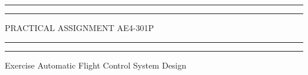  
    \begin{titlepage} %

        \centering %
        
        \scshape %
        
        \vspace*{\baselineskip} %
        
        
        \rule{\textwidth}{1.6pt}\vspace*{-\baselineskip}\vspace*{2pt} %
        \rule{\textwidth}{0.4pt} %
        
        \vspace{0.75\baselineskip} %
        
        {\LARGE PRACTICAL ASSIGNMENT AE4-301P} %
        
        \vspace{0.75\baselineskip} %
        
        \rule{\textwidth}{0.4pt}\vspace*{-\baselineskip}\vspace{3.2pt} %
        \rule{\textwidth}{1.6pt} %
        
        \vspace{2\baselineskip} %
        
        
        Exercise Automatic Flight Control System Design
        
        \vspace*{3\baselineskip} %
        
        
        \vspace{0.5\baselineskip} %
        

\end{titlepage}
